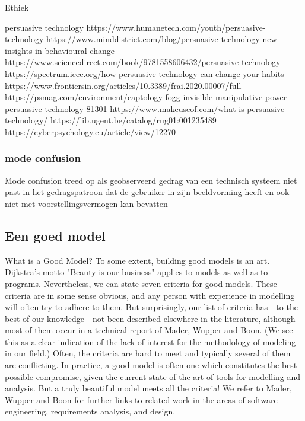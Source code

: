 Ethiek 



persuasive technology 
https://www.humanetech.com/youth/persuasive-technology 
https://www.minddistrict.com/blog/persuasive-technology-new-insights-in-behavioural-change 
https://www.sciencedirect.com/book/9781558606432/persuasive-technology 
https://spectrum.ieee.org/how-persuasive-technology-can-change-your-habits 
https://www.frontiersin.org/articles/10.3389/frai.2020.00007/full 
https://psmag.com/environment/captology-fogg-invisible-manipulative-power-persuasive-technology-81301 
https://www.makeuseof.com/what-is-persuasive-technology/ 
https://lib.ugent.be/catalog/rug01:001235489 
https://cyberpsychology.eu/article/view/12270 


\subsubsection{mode confusion }
Mode confusion treed op als geobserveerd gedrag van een technisch systeem niet past in het gedragspatroon 
dat de gebruiker in zijn beeldvorming heeft en ook niet met voorstellingsvermogen kan bevatten 


\subsection{Een goed model}

What is a Good Model?
To some extent, building good models is an art. Dijkstra's motto "Beauty is our business" applies to models as well as to programs. Nevertheless, we can state seven criteria for good models. These criteria are in some sense obvious, and any person with experience in modelling will often try to adhere to them. But surprisingly, our list of criteria has - to the best of our knowledge - not been described elsewhere in the literature, although most of them occur in a technical report of Mader, Wupper and Boon. (We see this as a clear indication of the lack of interest for the methodology of modeling in our field.) Often, the criteria are hard to meet and typically several of them are conflicting. In practice, a good model is often one which constitutes the best possible compromise, given the current state-of-the-art of tools for modelling and analysis. But a truly beautiful model meets all the criteria! We refer to Mader, Wupper and Boon for further links to related work in the areas of software engineering, requirements analysis, and design.

